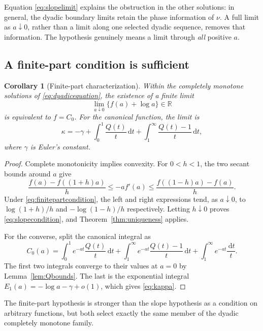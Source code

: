 \documentclass[11pt,letterpaper]{article}
\numberwithin{equation}{section}
\newtheorem{corollary}[theorem]{Corollary}
\theoremstyle{definition}
\theoremstyle{remark}
\newcommand{\R}{\mathbb R}
\newcommand{\dd}{\,\mathrm d}
\begin{document}
Equation \eqref{eq:slopelimit} explains the obstruction in the other
solutions: in general, the dyadic boundary limits retain the phase
information of $\nu$. A full limit as $a\downarrow0$, rather than a
limit along one selected dyadic sequence, removes that information.
The hypothesis genuinely means a limit through \emph{all} positive $a$.

\subsection{A finite-part condition is sufficient}
\begin{corollary}[Finite-part characterization]\label{cor:finitepart}
Within the completely monotone solutions of \eqref{eq:dyadicequation},
the existence of a finite limit
\begin{equation}\label{eq:finitepartcondition}
 \lim_{a\downarrow0}\{f(a)+\log a\}\in\R
\end{equation}
is equivalent to $f=C_0$. For the canonical function, the limit is
\begin{equation}\label{eq:kappa}
 \kappa=-\gamma+
     \int_0^1\frac{Q(t)}t\dd t+
     \int_1^\infty\frac{Q(t)-1}t\dd t,
\end{equation}
where $\gamma$ is Euler's constant.
\end{corollary}
\begin{proof}
Complete monotonicity implies convexity. For $0<h<1$, the two secant
bounds around $a$ give
\begin{equation}\label{eq:convexbounds}
 \frac{f(a)-f((1+h)a)}h
 \le -af'(a)
 \le\frac{f((1-h)a)-f(a)}h.
\end{equation}
Under \eqref{eq:finitepartcondition}, the left and right expressions tend,
as $a\downarrow0$, to $\log(1+h)/h$ and $-\log(1-h)/h$ respectively.
Letting $h\downarrow0$ proves \eqref{eq:slopecondition}, and
Theorem~\ref{thm:uniqueness} applies.

For the converse, split the canonical integral as
\[
 C_0(a)=\int_0^1e^{-at}\frac{Q(t)}t\dd t
       +\int_1^\infty e^{-at}\frac{Q(t)-1}t\dd t
       +\int_1^\infty e^{-at}\frac{\dd t}{t}.
\]
The first two integrals converge to their values at $a=0$ by
Lemma~\ref{lem:Qbounds}. The last is the exponential integral
$E_1(a)=-\log a-\gamma+o(1)$, which gives \eqref{eq:kappa}.
\end{proof}

The finite-part hypothesis is stronger than the slope hypothesis as a
condition on arbitrary functions, but both select exactly the same member
of the dyadic completely monotone family.
\end{document}
